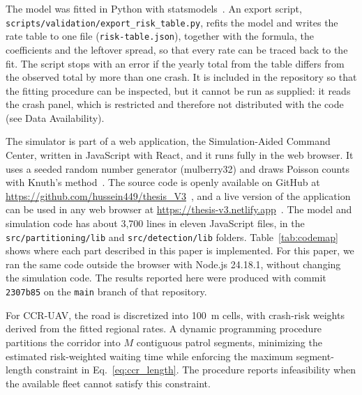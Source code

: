 \documentclass[11pt]{article}
\begin{document}
The model was fitted in Python with statsmodels~\cite{seabold2010}. An export
script, \texttt{scripts/validation/export\_risk\_table.py}, refits
the model and writes the rate table to one file
(\texttt{risk-table.json}), together with the formula, the coefficients and the
leftover spread, so that every rate can be traced back to the fit. The script
stops with an error if the yearly total from the table differs from the
observed total by more than one crash. It is included in the repository so
that the fitting procedure can be inspected, but it cannot be run as supplied:
it reads the crash panel, which is restricted and therefore not distributed
with the code (see Data Availability).

The simulator is part of a web application, the Simulation-Aided Command
Center, written in JavaScript with React, and it runs fully in the web
browser. It uses a seeded random number generator (mulberry32) and draws
Poisson counts with Knuth's method~\cite{knuth1997}. The source code is openly
available on GitHub at \url{https://github.com/hussein449/thesis_V3}~\cite{thesiscode},
and a live version of the application can be used in any web browser at
\url{https://thesis-v3.netlify.app}~\cite{thesisapp}. The model and simulation code
has about 3{,}700 lines in eleven JavaScript files, in the
\texttt{src/partitioning/lib} and \texttt{src/detection/lib} folders.
Table~\ref{tab:codemap} shows where each part described in this paper is
implemented. For this paper, we ran the
same code outside the browser with Node.js 24.18.1, without changing the
simulation code. The results reported here were produced with commit
\texttt{2307b85} on the \texttt{main} branch of that repository.


For CCR-UAV, the road is discretized into 100~m cells, with crash-risk weights derived from the fitted regional rates. A dynamic programming procedure partitions the corridor into $M$ contiguous patrol segments,
minimizing the estimated risk-weighted waiting time while enforcing the maximum segment-length constraint in Eq.~\eqref{eq:ccr_length}.
The procedure reports infeasibility when the available fleet cannot
satisfy this constraint.
\end{document}
